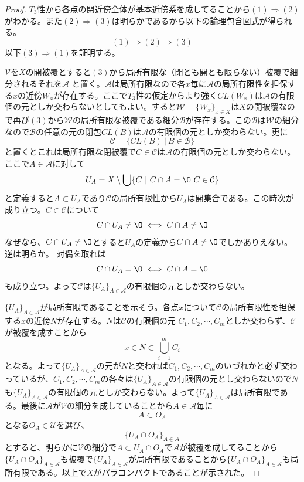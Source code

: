 \documentclass[leqno]{jsarticle}
\newcommand{\To}{\Longrightarrow}
\begin{document}
\begin{proof}
$T_3$性から各点の閉近傍全体が基本近傍系を成してることから$(1)\To (2)$がわかる。また$(2)\To (3)$は明らかであるから以下の論理包含図式が得られる。
\[
(1)\To (2)\To (3)
\]
以下$(3)\To(1)$を証明する。\par
[$(3)\To (1)$の証明]\par
$\mathcal{V}$を$X$の開被覆とすると$(3)$から局所有限な（閉とも開とも限らない）被覆で細分されるそれを$\mathcal{A}$
と置く。$\mathcal{A}$は局所有限なので各$x$毎に$\mathcal{A}$の局所有限性を担保する$x$の近傍$W_x$が存在する。ここで$T_3$性の仮定からより強く$CL(W_x)$は$\mathcal{A}$の有限個の元としか交わらないとしてもよい。すると$\mathcal{W}=\{W_x\}_{x\in X}$は$X$の開被覆なので再び$(3)$から$\mathcal{W}$の局所有限な被覆である細分$\mathcal{B}$が存在する。この$\mathcal{B}$は$\mathcal{W}$の細分なので$\mathcal{B}$の任意の元の閉包$CL(B)$は$\mathcal{A}$の有限個の元としか交わらない。更に
\[
\mathcal{C}=\{CL(B)\ |\ B\in \mathcal{B}\}
\]
と置くとこれは局所有限な閉被覆で$C\in\mathcal{C}$は$\mathcal{A}$の有限個の元としか交わらない。
ここで$A\in \mathcal{A}$に対して
\[
U_A=X\setminus \bigcup\{C\ |\ C\cap A=\O\ C\in \mathcal{C}\}
\]
と定義すると$A\subset U_A$であり$\mathcal{C}$の局所有限性から$U_A$は開集合である。この時次が成り立つ。$C\in \mathcal{C}$について
\[
C\cap U_A\neq\O \iff C\cap A\neq\O
\]
なぜなら、$C\cap U_A\neq\O$とすると$U_A$の定義から$C\cap A\neq \O$でしかありえない。逆は明らか。
対偶を取れば
\[
C\cap U_A=\O \iff C\cap A=\O
\]
も成り立つ。よって$\mathcal{C}$は$\{U_A\}_{A\in \mathcal{A}}$の有限個の元としか交わらない。\par
$\{U_A\}_{A\in \mathcal{A}}$が局所有限であることを示そう。各点$x$について$\mathcal{C}$の局所有限性を担保する$x$の近傍$N$が存在する。$N$は$\mathcal{C}$の有限個の元
$C_1,C_2,\cdots ,C_m$としか交わらず、$\mathcal{C}$が被覆を成すことから
\[
x\in N\subset \bigcup_{i=1}^mC_i
\]
となる。よって$\{U_A\}_{A\in \mathcal{A}}$の元が$N$と交われば$C_1,C_2,\cdots ,C_m$のいづれかと必ず交わっているが、$C_1,C_2,\cdots ,C_m$の各々は$\{U_A\}_{A\in \mathcal{A}}$の有限個の元とし交わらないので$N$も$\{U_A\}_{A\in \mathcal{A}}$の有限個の元としか交わらない。よって$\{U_A\}_{A\in \mathcal{A}}$は局所有限である。最後に$\mathcal{A}$が$\mathcal{V}$の細分を成していることから$A\in \mathcal{A}$毎に
\[
A\subset O_A 
\]
となる$O_A\in \mathcal{U}$を選び、
\[
\{U_A\cap O_A\}_{A\in \mathcal{A}}
\]
とすると、明らかに$\mathcal{V}$の細分で$A\subset U_A\cap O_A$で$\mathcal{A}$が被覆を成してることから$\{U_A\cap O_A\}_{A\in \mathcal{A}}$も被覆で$\{U_A\}_{A\in \mathcal{A}}$が局所有限であることから$\{U_A\cap O_A\}_{A\in \mathcal{A}}$も局所有限である。以上で$X$がパラコンパクトであることが示された。
\par[$(3)\To (1)$の証明終わり]

\end{proof}
\end{document}
